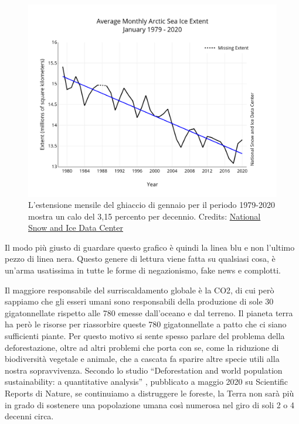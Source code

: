 \documentclass[12pt]{book} %
\begin{document}
\needspace{4cm}
\begin{figure}[H]
  \centering
  \includegraphics[width=0.95\linewidth]{images/Libro-img021.png}
  \caption{L'estensione mensile del ghiaccio di gennaio per il
periodo 1979-2020 mostra un calo del 3,15 percento per decennio. Credits: \href{https://nsidc.org/arcticseaicenews/2020/02/}{National Snow and Ice Data Center}}
\end{figure}

Il modo più giusto di guardare questo grafico è quindi la linea blu e non l'ultimo pezzo di linea
nera. Questo genere di lettura viene fatta su qualsiasi cosa, è un'arma usatissima in tutte le
forme di negazionismo, fake news e complotti.

Il maggiore responsabile del surriscaldamento globale è la CO2, di cui però sappiamo che gli esseri umani sono responsabili della
produzione di sole 30 gigatonnellate rispetto alle 780 emesse dall'oceano e dal
terreno. Il pianeta terra ha però le risorse per riassorbire queste 780 gigatonnellate a patto che ci siano sufficienti
piante. Per questo motivo si sente spesso parlare del problema della deforestazione, oltre ad altri problemi che porta
con se, come la riduzione di biodiversità vegetale e animale, che a cascata fa sparire altre specie utili alla nostra
sopravvivenza. Secondo lo studio “Deforestation and world population sustainability: a quantitative
analysis” , pubblicato a maggio 2020 su Scientific
Reports di Nature, se continuiamo a distruggere le foreste, la Terra non sarà più in grado di sostenere una popolazione
umana così numerosa nel giro di soli 2 o 4 decenni circa.
\end{document}
